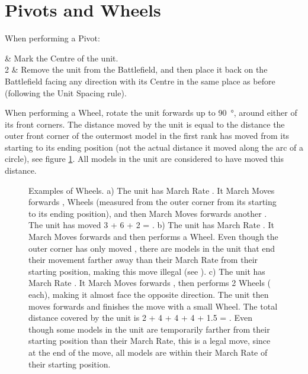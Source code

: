 \section{Pivots and Wheels}
\label{pivots_and_wheels}

When performing a Pivot:

 & Mark the Centre of the unit.\\
2 & Remove the unit from the Battlefield, and then place it back on the Battlefield facing any direction with its Centre in the same place as before (following the Unit Spacing rule).\\
\closeseqtable

When performing a Wheel, rotate the unit forwards up to \SI{90}{\degree}, around either of its front corners. The distance moved by the unit is equal to the distance the outer front corner of the outermost model in the first rank has moved from its starting to its ending position (not the actual distance it moved along the arc of a circle), see figure \ref{figure/wheels}. All models in the unit are considered to have moved this distance.

\newcommand{\wheelsA}{a)}
\newcommand{\wheelsB}{b)}
\newcommand{\wheelsC}{c)}

\begin{figure}[!htbp]
\centering
\renewcommand{\figbiglettersize}{15}
\hypertarget{wheels_figure}{
\def\svgwidth{\textwidth}
}
\caption{Examples of Wheels.\captionpar
a) The unit has March Rate . It March Moves forwards , Wheels  (measured from the outer corner from its starting to its ending position), and then March Moves forwards another . The unit has moved 3 + 6 + 2 = .\captionpar
b) The unit has March Rate . It March Moves forwards  and then performs a  Wheel. Even though the outer corner has only moved , there are models in the unit that end their movement farther away than their March Rate from their starting position, making this move illegal (see ).\captionpar
c) The unit has March Rate . It March Moves forwards , then performs 2 Wheels ( each), making it almost face the opposite direction. The unit then moves forwards  and finishes the move with a small  Wheel. The total distance covered by the unit is 2 + 4 + 4 + 4 + 1.5 = .\newline
Even though some models in the unit are temporarily farther from their starting position than their March Rate, this is a legal move, since at the end of the move, all models are within their March Rate of their starting position.}
\label{figure/wheels}
\end{figure}
